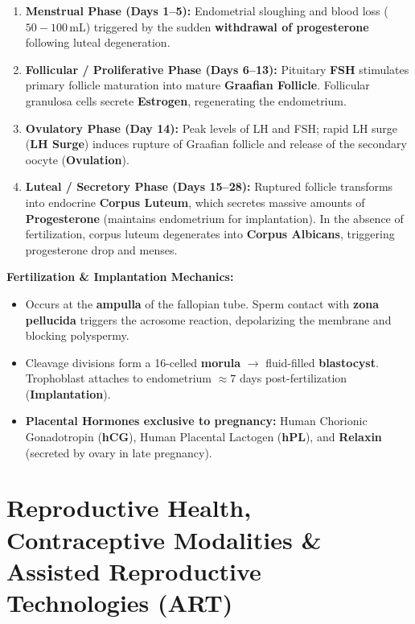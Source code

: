 \documentclass[10pt,twoside,openright]{book}
\begin{document}
\begin{conceptbox}
\begin{enumerate}[leftmargin=*]
  \item \textbf{Menstrual Phase (Days 1--5):} Endometrial sloughing and blood loss ($50-100\,\mathrm{mL}$) triggered by the sudden \textbf{withdrawal of progesterone} following luteal degeneration.
  \item \textbf{Follicular / Proliferative Phase (Days 6--13):} Pituitary \textbf{FSH} stimulates primary follicle maturation into mature \textbf{Graafian Follicle}. Follicular granulosa cells secrete \textbf{Estrogen}, regenerating the endometrium.
  \item \textbf{Ovulatory Phase (Day 14):} Peak levels of LH and FSH; rapid LH surge (\textbf{LH Surge}) induces rupture of Graafian follicle and release of the secondary oocyte (\textbf{Ovulation}).
  \item \textbf{Luteal / Secretory Phase (Days 15--28):} Ruptured follicle transforms into endocrine \textbf{Corpus Luteum}, which secretes massive amounts of \textbf{Progesterone} (maintains endometrium for implantation). In the absence of fertilization, corpus luteum degenerates into \textbf{Corpus Albicans}, triggering progesterone drop and menses.
\end{enumerate}

\textbf{Fertilization \& Implantation Mechanics:}
\begin{itemize}
  \item Occurs at the \textbf{ampulla} of the fallopian tube. Sperm contact with \textbf{zona pellucida} triggers the acrosome reaction, depolarizing the membrane and blocking polyspermy.
  \item Cleavage divisions form a 16-celled \textbf{morula} $\to$ fluid-filled \textbf{blastocyst}. Trophoblast attaches to endometrium $\approx 7$ days post-fertilization (\textbf{Implantation}).
  \item \textbf{Placental Hormones exclusive to pregnancy:} Human Chorionic Gonadotropin (\textbf{hCG}), Human Placental Lactogen (\textbf{hPL}), and \textbf{Relaxin} (secreted by ovary in late pregnancy).
\end{itemize}
\end{conceptbox}

\section{Reproductive Health, Contraceptive Modalities \& Assisted Reproductive Technologies (ART)}
\end{document}
